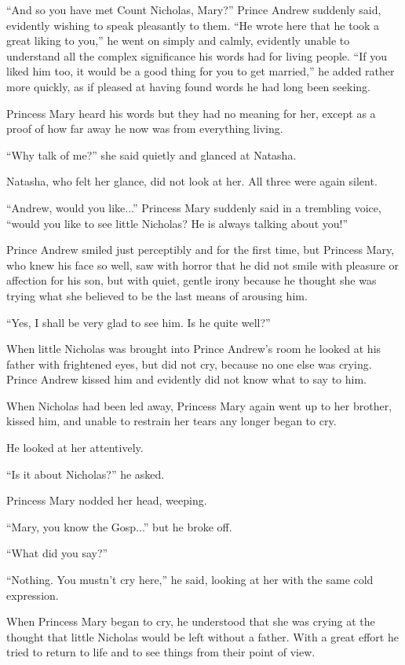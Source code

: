 ``And so you have met Count Nicholas, Mary?'' Prince Andrew
suddenly said, evidently wishing to speak pleasantly to
them. ``He wrote here that he took a great liking to you,'' he
went on simply and calmly, evidently unable to understand all the
complex significance his words had for living people. ``If you
liked him too, it would be a good thing for you to get married,''
he added rather more quickly, as if pleased at having found words
he had long been seeking.

Princess Mary heard his words but they had no meaning for her,
except as a proof of how far away he now was from everything
living.

``Why talk of me?'' she said quietly and glanced at Natasha.

Natasha, who felt her glance, did not look at her. All three were
again silent.

``Andrew, would you like...'' Princess Mary suddenly said in a
trembling voice, ``would you like to see little Nicholas? He is
always talking about you!''

Prince Andrew smiled just perceptibly and for the first time, but
Princess Mary, who knew his face so well, saw with horror that he
did not smile with pleasure or affection for his son, but with
quiet, gentle irony because he thought she was trying what she
believed to be the last means of arousing him.

``Yes, I shall be very glad to see him. Is he quite well?''

When little Nicholas was brought into Prince Andrew's room he
looked at his father with frightened eyes, but did not cry,
because no one else was crying. Prince Andrew kissed him and
evidently did not know what to say to him.

When Nicholas had been led away, Princess Mary again went up to
her brother, kissed him, and unable to restrain her tears any
longer began to cry.

He looked at her attentively.

``Is it about Nicholas?'' he asked.

Princess Mary nodded her head, weeping.

``Mary, you know the Gosp...'' but he broke off.

``What did you say?''

``Nothing. You mustn't cry here,'' he said, looking at her with
the same cold expression.

When Princess Mary began to cry, he understood that she was
crying at the thought that little Nicholas would be left without
a father. With a great effort he tried to return to life and to
see things from their point of view.

